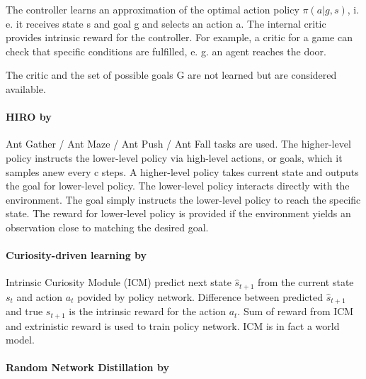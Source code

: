 \documentclass[acmsmall, nonacm]{acmart}
\begin{document}
The controller learns an approximation of the optimal action policy $\pi(a|g,s)$, i. e. it receives state s and goal g and selects an action a. The internal critic provides intrinsic reward for the controller. For example, a critic for a game can check that specific conditions are fulfilled, e. g. an agent reaches the door.

The critic and the set of possible goals G are not learned but are considered available.


\paragraph{HIRO by~\citet{Nachum2018DataEfficientHR}} %
\label{par:hiro}

Ant Gather / Ant Maze / Ant Push / Ant Fall tasks are used. The higher-level policy instructs the lower-level policy via high-level actions, or goals, which it samples anew every c steps. A higher-level policy takes current state and outputs the goal for lower-level policy. The lower-level policy interacts directly with the environment. The goal simply instructs the lower-level policy to reach the specific state. The reward for lower-level policy is provided if the environment yields an observation close to matching the desired goal.


\paragraph{Curiosity-driven learning by~\citet{pathak_curiosity-driven_2017}} %
\label{par:curiosity_driven_rl}

Intrinsic Curiosity Module (ICM) predict next state $\hat{s}_{t+1}$ from the current state $s_t$ and action $a_t$ povided by policy network. Difference between predicted $\hat{s}_{t+1}$ and true $s_{t+1}$ is the intrinsic reward for the action $a_t$. Sum of reward from ICM and extrinistic reward is used to train policy network. ICM is in fact a world model.


\paragraph{Random Network Distillation by~\citet{burda_exploration_2019}} %
\label{par:random_distillation}
\end{document}
